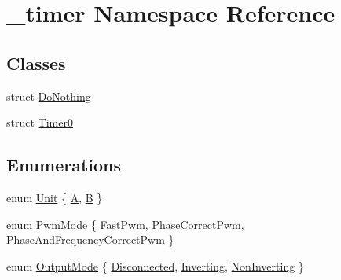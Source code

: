 \hypertarget{namespace__timer}{}\section{\+\_\+timer Namespace Reference}
\label{namespace__timer}
\subsection*{Classes}
\begin{DoxyCompactItemize}
\item 
struct \hyperlink{struct__timer_1_1DoNothing}{Do\+Nothing}
\item 
struct \hyperlink{struct__timer_1_1Timer0}{Timer0}
\end{DoxyCompactItemize}
\subsection*{Enumerations}
\begin{DoxyCompactItemize}
\item 
enum \hyperlink{namespace__timer_a4c93e7a88337cc004dc6b426dd36156e}{Unit} \{ \newline
\hyperlink{namespace__timer_a4c93e7a88337cc004dc6b426dd36156ea18fad1232f8f2db875811a442049952c}{A}, 
\newline
\hyperlink{namespace__timer_a4c93e7a88337cc004dc6b426dd36156ea716d9a8496f951ca2d0bd7a996539212}{B}
 \}
\item 
enum \hyperlink{namespace__timer_a339855be81c58fee57af09f84fdf9618}{Pwm\+Mode} \{ \newline
\hyperlink{namespace__timer_a339855be81c58fee57af09f84fdf9618a6022cbb8adceede4cc04b8358f8b9a32}{Fast\+Pwm}, 
\newline
\hyperlink{namespace__timer_a339855be81c58fee57af09f84fdf9618a56225cf472a71019b35d9feb9a0ae346}{Phase\+Correct\+Pwm}, 
\newline
\hyperlink{namespace__timer_a339855be81c58fee57af09f84fdf9618abaa1e13489a759669b55d8fae7de7019}{Phase\+And\+Frequency\+Correct\+Pwm}
 \}
\item 
enum \hyperlink{namespace__timer_a8904e4986a9ed2eb8af954bd2701faae}{Output\+Mode} \{ \newline
\hyperlink{namespace__timer_a8904e4986a9ed2eb8af954bd2701faaea02cb641147e9fb4dc2a5015ff8fd0e35}{Disconnected}, 
\newline
\hyperlink{namespace__timer_a8904e4986a9ed2eb8af954bd2701faaeabca426c8252b65b34b47355b066a62a5}{Inverting}, 
\newline
\hyperlink{namespace__timer_a8904e4986a9ed2eb8af954bd2701faaead5e88f843e06886280c5acff714d5525}{Non\+Inverting}
 \}
\end{DoxyCompactItemize}



